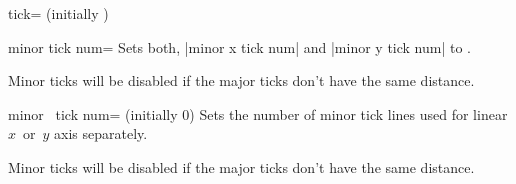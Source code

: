 \begin{pgfplotsxykey}{\x tick= (initially \marg{})}
\begin{codeexample}[]
\end{codeexample}
\end{pgfplotsxykey}

\begin{pgfplotskey}{minor tick num=}
	Sets both, |minor x tick num| and |minor y tick num| to .

	Minor ticks will be disabled if the major ticks don't have the same distance.
\begin{codeexample}[]
\end{codeexample}

\begin{codeexample}[]
\end{codeexample}

\end{pgfplotskey}

\begin{pgfplotsxykey}{minor \x\ tick num= (initially 0)}
	Sets the number of minor tick lines used for linear $x$~or~$y$ axis separately.

	Minor ticks will be disabled if the major ticks don't have the same distance.
\begin{codeexample}[]
\end{codeexample}

\end{pgfplotsxykey}

